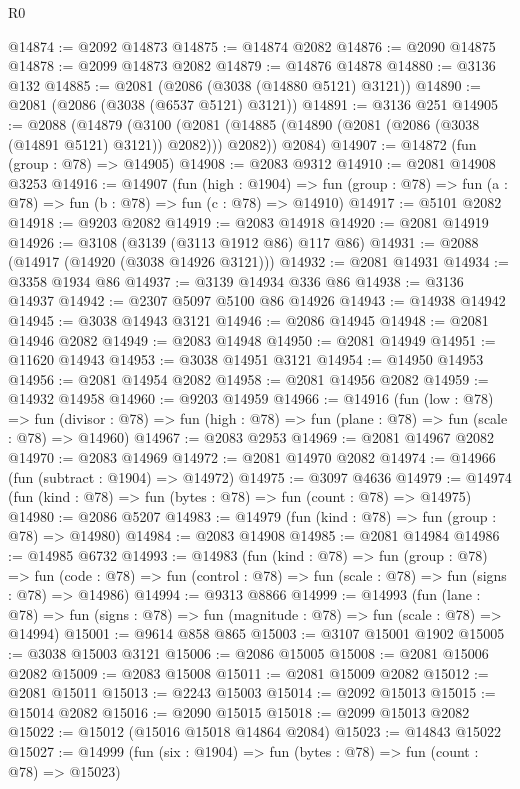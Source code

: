 \begin{lexlean}{R0}
\begin{coremodule}
@14874 := @2092 @14873
@14875 := @14874 @2082
@14876 := @2090 @14875
@14878 := @2099 @14873 @2082
@14879 := @14876 @14878
@14880 := @3136 @132
@14885 := @2081 (@2086 (@3038 (@14880 @5121) @3121))
@14890 := @2081 (@2086 (@3038 (@6537 @5121) @3121))
@14891 := @3136 @251
@14905 := @2088
    (@14879
      (@3100 (@2081 (@14885 (@14890 (@2081 (@2086 (@3038 (@14891 @5121) @3121)) @2082))) @2082))
      @2084)
@14907 := @14872 (fun (group : @78) => @14905)
@14908 := @2083 @9312
@14910 := @2081 @14908 @3253
@14916 := @14907
    (fun (high : @1904) =>
    fun (group : @78) => fun (a : @78) => fun (b : @78) => fun (c : @78) => @14910)
@14917 := @5101 @2082
@14918 := @9203 @2082
@14919 := @2083 @14918
@14920 := @2081 @14919
@14926 := @3108 (@3139 (@3113 @1912 @86) @117 @86)
@14931 := @2088 (@14917 (@14920 (@3038 @14926 @3121)))
@14932 := @2081 @14931
@14934 := @3358 @1934 @86
@14937 := @3139 @14934 @336 @86
@14938 := @3136 @14937
@14942 := @2307 @5097 @5100 @86 @14926
@14943 := @14938 @14942
@14945 := @3038 @14943 @3121
@14946 := @2086 @14945
@14948 := @2081 @14946 @2082
@14949 := @2083 @14948
@14950 := @2081 @14949
@14951 := @11620 @14943
@14953 := @3038 @14951 @3121
@14954 := @14950 @14953
@14956 := @2081 @14954 @2082
@14958 := @2081 @14956 @2082
@14959 := @14932 @14958
@14960 := @9203 @14959
@14966 := @14916
    (fun (low : @78) =>
    fun (divisor : @78) => fun (high : @78) => fun (plane : @78) => fun (scale : @78) => @14960)
@14967 := @2083 @2953
@14969 := @2081 @14967 @2082
@14970 := @2083 @14969
@14972 := @2081 @14970 @2082
@14974 := @14966 (fun (subtract : @1904) => @14972)
@14975 := @3097 @4636
@14979 := @14974 (fun (kind : @78) => fun (bytes : @78) => fun (count : @78) => @14975)
@14980 := @2086 @5207
@14983 := @14979 (fun (kind : @78) => fun (group : @78) => @14980)
@14984 := @2083 @14908
@14985 := @2081 @14984
@14986 := @14985 @6732
@14993 := @14983
    (fun (kind : @78) =>
    fun (group : @78) =>
    fun (code : @78) => fun (control : @78) => fun (scale : @78) => fun (signs : @78) => @14986)
@14994 := @9313 @8866
@14999 := @14993
    (fun (lane : @78) => fun (signs : @78) => fun (magnitude : @78) => fun (scale : @78) => @14994)
@15001 := @9614 @858 @865
@15003 := @3107 @15001 @1902
@15005 := @3038 @15003 @3121
@15006 := @2086 @15005
@15008 := @2081 @15006 @2082
@15009 := @2083 @15008
@15011 := @2081 @15009 @2082
@15012 := @2081 @15011
@15013 := @2243 @15003
@15014 := @2092 @15013
@15015 := @15014 @2082
@15016 := @2090 @15015
@15018 := @2099 @15013 @2082
@15022 := @15012 (@15016 @15018 @14864 @2084)
@15023 := @14843 @15022
@15027 := @14999 (fun (six : @1904) => fun (bytes : @78) => fun (count : @78) => @15023)

\end{coremodule}
\end{lexlean}
